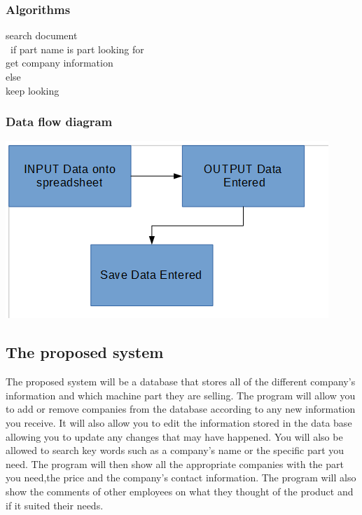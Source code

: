 \subsubsection{Algorithms}

search document\\\
if part name is part looking for\\
get company information\\
else\\
keep looking

\subsubsection{Data flow diagram}
\includegraphics{FCCS.jpg}
\clearpage

\subsection{The proposed system}
The proposed system will be a database that stores all of the different company's information and which machine part they are selling. The program will allow you to add or remove companies from the database according to any new information you receive. It will also allow you to edit the information stored in the data base allowing you to update any changes that may have happened. You will also be allowed to search key words such as a company's name or the specific part you need. The program will then show all the appropriate companies with the part you need,the price and the company's contact information. The program will also show the comments of other employees on what they thought of the product and if it suited their needs.

